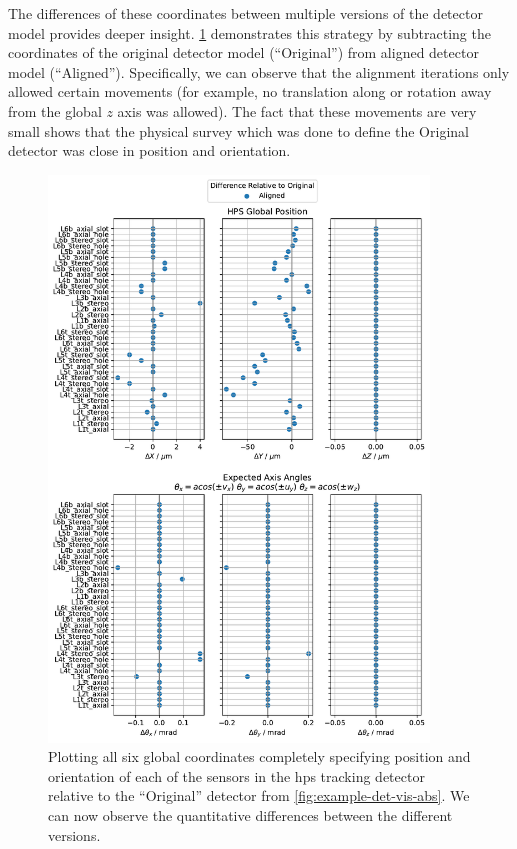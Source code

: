 The differences of these coordinates between multiple versions of the detector model
provides deeper insight.
\cref{fig:example-det-vis-diff} demonstrates this strategy by subtracting
the coordinates of the original detector model (``Original'') from aligned detector model (``Aligned'').
Specifically, we can observe that the alignment iterations only allowed certain movements
(for example, no translation along or rotation away from the global $z$ axis was allowed).
The fact that these movements are very small shows that the physical survey which was done
to define the Original detector was close in position and orientation.

\begin{figure}
  \centering
  \includegraphics[width=0.9\textwidth]{figures/hps/alignment/example-det-vis-diff.pdf}
  \caption{Plotting all six global coordinates completely specifying position and
    orientation of each of the sensors in the \ac{hps} tracking detector relative to
    the ``Original'' detector from \cref{fig:example-det-vis-abs}. We can now observe
    the quantitative differences between the different versions.}
  \label{fig:example-det-vis-diff}
\end{figure}

